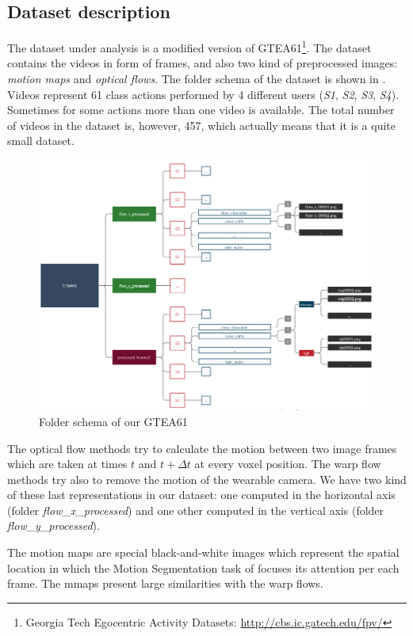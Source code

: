 \documentclass[10pt,twocolumn,hidelinks,letterpaper]{article}
\begin{document}
\subsection{Dataset description}

The dataset under analysis is a modified version of GTEA61\footnote{Georgia Tech Egocentric Activity Datasets: \small{\url{http://cbs.ic.gatech.edu/fpv/}}}. The dataset contains the videos in form of frames, and also two kind of preprocessed images: \textit{motion maps} and \textit{optical flows}. The folder schema of the dataset is shown in . Videos represent 61 class actions performed by 4 different users (\textit{S1}, \textit{S2}, \textit{S3}, \textit{S4}). Sometimes for some actions more than one video is available. The total number of videos in the dataset is, however, 457, which actually means that it is a quite small dataset.

\begin{figure}
	\centering
	\includegraphics[width=.9\linewidth]{images/folder_schema.png}
	\caption{Folder schema of our GTEA61}
	\label{folder_schema}
\end{figure}

The optical flow methods try to calculate the motion between two image frames which are taken at times $t$ and $t + \Delta t$ at every voxel position. The warp flow methods try also to remove the motion of the wearable camera. We have two kind of these last representations in our dataset: one computed in the horizontal axis (folder \textit{flow\_x\_processed}) and one other computed in the vertical axis (folder \textit{flow\_y\_processed}).

The motion maps are special black-and-white images which represent the spatial location in which the Motion Segmentation task of \cite{sparnet} focuses its attention per each frame. The mmaps present large similarities with the warp flows.
\end{document}
